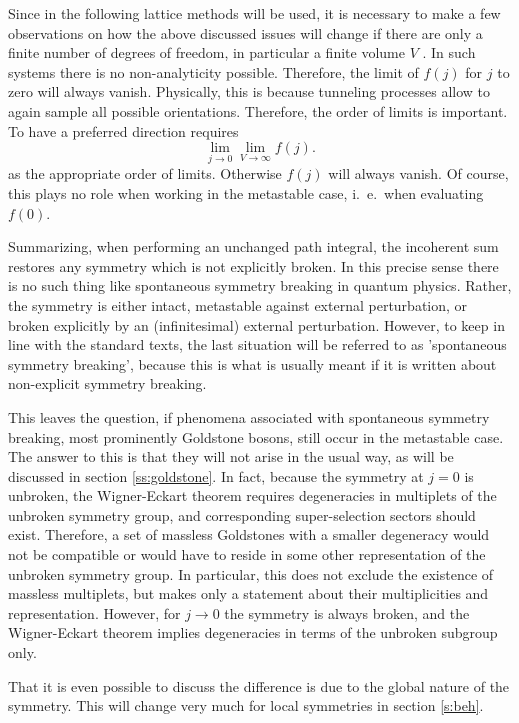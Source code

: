 \documentclass[final,12pt,3p,longtitle]{elsarticle}
\newcommand*{\no}{\noindent}
\newcommand*{\be}{\begin{equation}}
\newcommand*{\ee}{\end{equation}}
\newcommand*{\nn}{\nonumber}
\newcommand*{\1}{1\!\!\!\bot}
\begin{document}
Since in the following lattice methods will be used, it is necessary to make a few observations on how the above discussed issues will change if there are only a finite number of degrees of freedom, in particular a finite volume $V$ \cite{Landau:2005mc,Perez:2008fv,Birman:2013gaa}. In such systems there is no non-analyticity possible. Therefore, the limit of $f(j)$ for $j$ to zero will always vanish. Physically, this is because tunneling processes allow to again sample all possible orientations. Therefore, the order of limits is important. To have a preferred direction requires
\be
\lim_{j\to 0}\lim_{V\to\infty}f(j)\nn.
\ee
\no as the appropriate order of limits. Otherwise $f(j)$ will always vanish. Of course, this plays no role when working in the metastable case, i.\ e.\ when evaluating $f(0)$.

Summarizing, when performing an unchanged path integral, the incoherent sum restores any symmetry which is not explicitly broken. In this precise sense there is no such thing like spontaneous symmetry breaking in quantum physics. Rather, the symmetry is either intact, metastable against external perturbation, or broken explicitly by an (infinitesimal) external perturbation. However, to keep in line with the standard texts, the last situation will be referred to as 'spontaneous symmetry breaking', because this is what is usually meant if it is written about non-explicit symmetry breaking.

This leaves the question, if phenomena associated with spontaneous symmetry breaking, most prominently Goldstone bosons, still occur in the metastable case. The answer to this is that they will not arise in the usual way, as will be discussed in section \ref{ss:goldstone}. In fact, because the symmetry at $j=0$ is unbroken, the Wigner-Eckart theorem requires degeneracies in multiplets of the unbroken symmetry group, and corresponding super-selection sectors should exist. Therefore, a set of massless Goldstones with a smaller degeneracy would not be compatible or would have to reside in some other representation of the unbroken symmetry group. In particular, this does not exclude the existence of massless multiplets, but makes only a statement about their multiplicities and representation. However, for $j\to 0$ the symmetry is always broken, and the Wigner-Eckart theorem implies degeneracies in terms of the unbroken subgroup only.

That it is even possible to discuss the difference is due to the global nature of the symmetry. This will change very much for local symmetries in section \ref{s:beh}.
\end{document}
